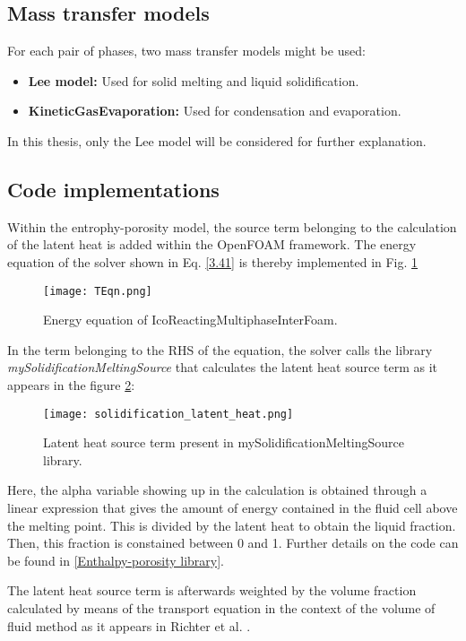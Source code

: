 \subsection{Mass transfer models}
For each pair of phases, two mass transfer models might be used:
\begin{itemize}
	\item \textbf{Lee model:} Used for solid melting and liquid solidification.
	\item \textbf{KineticGasEvaporation:} Used for condensation and evaporation.
\end{itemize}
In this thesis, only the Lee model will be considered for further explanation.


\subsection{Code implementations}

\setlength{\parindent}{0.5cm} Within the entrophy-porosity model, the source term belonging to the calculation of the latent heat is added within the OpenFOAM framework. The energy equation of the solver shown in Eq. \ref{3.41} is thereby implemented in Fig. \ref{3.8fig}
\begin{figure}[h!]
	\centering
	\texttt{[image: TEqn.png]}\hfill	
	\caption{Energy equation of IcoReactingMultiphaseInterFoam.}
	\label{3.8fig}
\end{figure}
In the term belonging to the RHS of the equation, the solver calls the library \textit{mySolidificationMeltingSource} that calculates the latent heat source term as it appears in the figure \ref{3.9fig}:
\begin{figure}[h!]
	\centering
	\texttt{[image: solidification\_latent\_heat.png]}\hfill
	\caption{Latent heat source term present in mySolidificationMeltingSource library.}
	\label{3.9fig}
\end{figure}
Here, the alpha variable showing up in the calculation is obtained through a linear expression that gives the amount of energy contained in the fluid cell above the melting point. This is divided by the latent heat to obtain the liquid fraction. Then, this fraction is constained between 0 and 1. Further details on the code can be found in \ref{Enthalpy-porosity library}.

The latent heat source term is afterwards weighted by the volume fraction calculated by means of the transport equation in the context of the volume of fluid method as it appears in Richter et al. \cite{richter_turnow_kornev_hassel_2016}.

